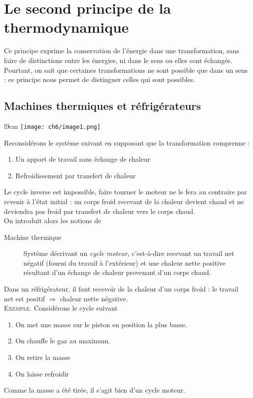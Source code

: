 \chapter{Le second principe de la thermodynamique} 
Ce principe exprime la conservation de l'énergie dans une transformation, 
sans faire de distinctions entre les énergies, ni dans le sens ou elles 
sont échangés. Pourtant, on sait que certaines transformations ne sont 
possible que dans un sens : ce principe nous permet de distinguer celles 
qui sont possibles.

	\section{Machines thermiques et réfrigérateurs}
	\begin{wrapfigure}[7]{l}{9cm}
	\vspace{-5mm}
	\texttt{[image: ch6/image1.png]}
	\end{wrapfigure}
	Reconsidérons le système suivant en supposant que la transformation 
	comprenne  :
	\begin{enumerate}
	\item Un apport de travail sans échange de chaleur
	\item Refroidissement par transfert de chaleur
	\end{enumerate}
	Le cycle inverse est impossible, faire tourner le moteur ne le fera 
	au contraire par revenir à l'état initial : un corps froid recevant 
	de la chaleur devient chaud et ne deviendra pas froid par transfert 
	de chaleur vers le corps chaud.\\
	On introduit alors les notions de 
	\begin{description}
	\item[Machine thermique] Système décrivant un \textit{cycle moteur}, 
	c'est-à-dire recevant un travail net négatif (fourni du travail à 
	l'extérieur) et une chaleur nette positive résultant d'un échange de 
	chaleur provenant d'un corps chaud.
	\end{description}
	Dans un réfrigérateur, il faut recevoir de la chaleur d'un corps 
	froid : le travail net est positif $\Rightarrow$ chaleur nette 
	négative.\\
	
	\textsc{Exemple}. Considérons le cycle suivant 
	\begin{enumerate}
	\item On met une masse sur le piston en position la plus basse.
	\item On chauffe le gaz au maximum.
	\item On retire la masse
	\item On laisse refroidir
	\end{enumerate}
	Comme la masse a été tirée, il s'agit bien d'un cycle moteur.\\
	
